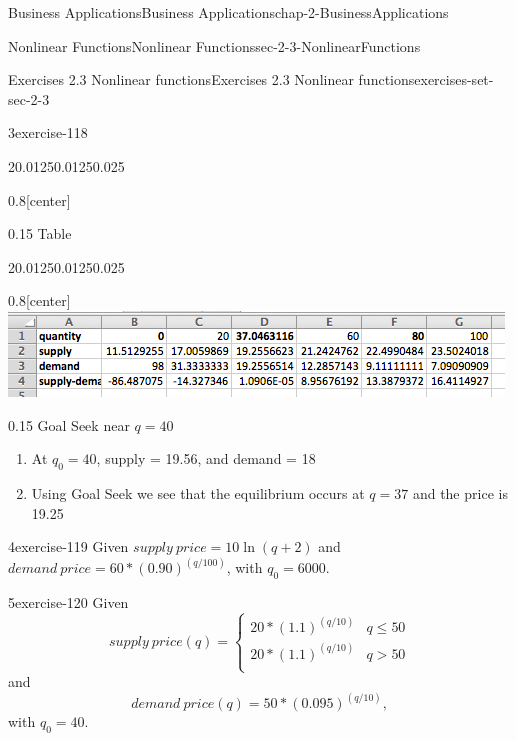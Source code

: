 \documentclass[oneside,10pt,]{book}
\numberwithin{equation}{section}
\newcommand{\gt}{>}
\begin{document}
\begin{chapterptx}{Business Applications}{}{Business Applications}{}{}{chap-2-BusinessApplications}
\begin{sectionptx}{Nonlinear Functions}{}{Nonlinear Functions}{}{}{sec-2-3-NonlinearFunctions}
\begin{exercises-subsection-numberless}{Exercises 2.3 Nonlinear functions}{}{Exercises 2.3 Nonlinear functions}{}{}{exercises-set-sec-2-3}
\begin{exercisegroup}
\begin{divisionexerciseeg}{3}{}{}{exercise-118}
\begin{sidebyside}{2}{0.0125}{0.0125}{0.025}
\begin{sbspanel}{0.8}[center]
\end{sbspanel}%
\begin{sbspanel}{0.15}%
\hypertarget{p-812}{}%
Table%
\end{sbspanel}%
\end{sidebyside}%
\begin{sidebyside}{2}{0.0125}{0.0125}{0.025}%
\begin{sbspanel}{0.8}[center]%
\includegraphics[width=1\linewidth]{images/sec2-3-sol3c.png}
\end{sbspanel}%
\begin{sbspanel}{0.15}%
\hypertarget{p-813}{}%
Goal Seek near \(q=40\)%
\end{sbspanel}%
\end{sidebyside}%
\leavevmode%
\begin{enumerate}[label=(\alph*)]
\item\hypertarget{li-226}{}\hypertarget{p-814}{}%
At \(q_0=40\), supply = \textdollar{}19.56, and demand = \textdollar{}18%
\item\hypertarget{li-227}{}\hypertarget{p-815}{}%
Using Goal Seek we see that the equilibrium occurs at \(q = 37\) and the price is \textdollar{}19.25%
\end{enumerate}
\end{divisionexerciseeg}%
\begin{divisionexerciseeg}{4}{}{}{exercise-119}%
\hypertarget{p-816}{}%
Given \(supply\ price=10 \ln(q+2)\) and \(demand\ price=60*(0.90)^{(q/100)}\), with \(q_0=6000\).%
\end{divisionexerciseeg}%
\begin{divisionexerciseeg}{5}{}{}{exercise-120}%
\hypertarget{p-817}{}%
Given%
%
\begin{equation*}
supply\ price(q)=\begin{cases}
20*(1.1)^{(q/10)}&q \le 50\\
20*(1.1)^{(q/10)}&q \gt 50\\
\end{cases}
\end{equation*}
\hypertarget{p-818}{}%
and%
%
\begin{equation*}
demand\ price(q)=50*(0.095)^{(q/10)},
\end{equation*}
\hypertarget{p-819}{}%
with \(q_0=40\).%

\end{divisionexerciseeg}
\end{exercisegroup}
\end{exercises-subsection-numberless}
\end{sectionptx}
\end{chapterptx}
\end{document}
